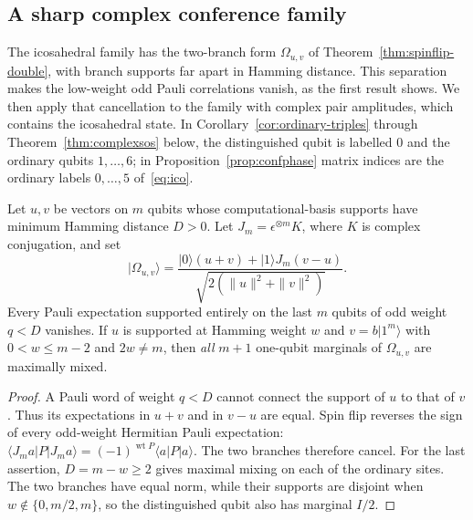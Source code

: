 \subsection{A sharp complex conference family}\label{sec:conference-phase}

The icosahedral family has the two-branch form $\Omega_{u,v}$ of Theorem~\ref{thm:spinflip-double}, with branch supports far apart in
Hamming distance. This separation makes the low-weight odd Pauli correlations vanish, as the first result shows. We then
apply that cancellation to the family with complex pair amplitudes, which contains the icosahedral state.
In Corollary~\ref{cor:ordinary-triples} through Theorem~\ref{thm:complexsos} below, the distinguished qubit is labelled $0$ and the
ordinary qubits $1,\ldots,6$; in Proposition~\ref{prop:confphase} matrix indices are the ordinary labels $0,\ldots,5$
of~\eqref{eq:ico}.

\begin{theorem}\label{thm:spinflip-double}
Let $u,v$ be vectors on $m$ qubits whose computational-basis
supports have minimum Hamming distance $D>0$. Let
$J_m=\epsilon^{\otimes m}K$, where $K$ is complex conjugation, and set
\[
 |\Omega_{u,v}\rangle=
 \frac{|0\rangle(u+v)+|1\rangle J_m(v-u)}
 {\sqrt{2(\|u\|^2+\|v\|^2)}}.
\]
Every Pauli expectation supported entirely on the last $m$ qubits
of odd weight $q<D$ vanishes. If $u$ is supported at Hamming weight
$w$ and $v=b|1^m\rangle$ with $0<w\le m-2$ and $2w\ne m$,
then \emph{all} $m+1$ one-qubit marginals of $\Omega_{u,v}$
are maximally mixed.
\end{theorem}
\begin{proof}
A Pauli word of weight $q<D$ cannot connect the support of $u$
to that of $v$. Thus its expectations in $u+v$ and in $v-u$
are equal. Spin flip reverses the sign of every odd-weight
Hermitian Pauli expectation:
$\langle J_m a|P|J_m a\rangle
=(-1)^{\operatorname{wt}P}\langle a|P|a\rangle$.
The two branches therefore cancel. For the last assertion,
$D=m-w\ge2$ gives maximal mixing on each of the ordinary
sites. The two branches have equal norm, while their supports
are disjoint when $w\notin\{0,m/2,m\}$, so the distinguished
qubit also has marginal $I/2$.
\end{proof}

